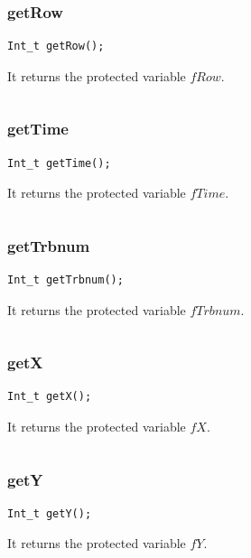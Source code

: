 \documentclass[a4paper]{book}
\begin{document}
\subsubsection{getRow}

\begin{lstlisting}
Int_t getRow();
\end{lstlisting}

It returns the protected variable $fRow$.

\[\]

\subsubsection{getTime}

\begin{lstlisting}
Int_t getTime();
\end{lstlisting}

It returns the protected variable $fTime$.

\[\]

\subsubsection{getTrbnum}

\begin{lstlisting}
Int_t getTrbnum();
\end{lstlisting}

It returns the protected variable $fTrbnum$.

\[\]

\subsubsection{getX}

\begin{lstlisting}
Int_t getX();
\end{lstlisting}

It returns the protected variable $fX$.

\[\]

\subsubsection{getY}

\begin{lstlisting}
Int_t getY();
\end{lstlisting}

It returns the protected variable $fY$.

\[\]
\end{document}
